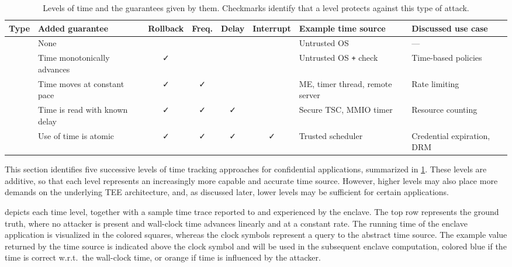 \documentclass[sigplan,10pt]{acmart}
\begin{document}
\newcommand{\tableNo}{}
\newcommand{\tableYes}{\faCheck}
\begin{table}[!t]
	\centering
	\footnotesize
	\caption{
Levels of time and the guarantees given by them. Checkmarks identify that a level protects against this type of attack.
        }
    \begin{tabularx}{\textwidth}{llccccll}    \toprule
			Type		&	Added guarantee				        & Rollback & Freq. & Delay & Interrupt & Example time source & Discussed use case \\ 
			\midrule
			\Tzero  & None   							          & \tableNo & \tableNo & \tableNo & \tableNo & Untrusted OS    				& ---       \\
			\Tone   & Time monotonically advances   & \tableYes & \tableNo & \tableNo & \tableNo & Untrusted OS \texttt{+} check & Time-based policies        \\
			\Ttwo   & Time moves at constant pace   & \tableYes & \tableYes & \tableNo & \tableNo & ME, timer thread, remote server			& Rate limiting       \\
			\Tthree & Time is read with known delay & \tableYes & \tableYes & \tableYes & \tableNo & Secure TSC, MMIO timer	& Resource counting      \\
			\Tfour  & Use of time is atomic  			  & \tableYes & \tableYes & \tableYes & \tableYes & Trusted scheduler & Credential expiration, DRM       \\
			\bottomrule
		\end{tabularx}
	\label{tab:time-types}
\end{table}

This section identifies five successive levels of time tracking approaches for
confidential applications, summarized in \cref{tab:time-types}. These levels are additive, so that each level represents
an increasingly more capable and accurate time source. However, higher levels
may also place more demands on the underlying TEE architecture, and, as
discussed later, lower levels may be sufficient for certain applications.

 depicts each time level, together with a sample time trace
reported to and experienced by the enclave. The top row represents the ground
truth, where no attacker is present and wall-clock time advances linearly and at
a constant rate. The running time of the enclave application is visualized in
the colored squares, whereas the clock symbols represent a query to the abstract
time source. The example value returned by the time source is indicated above
the clock symbol and will be used in the subsequent enclave computation, colored
blue if the time is correct w.r.t.\ the wall-clock time, or orange if time is
influenced by the attacker.
\end{document}
